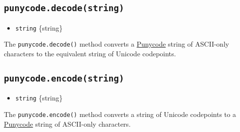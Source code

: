 \subsection{\texorpdfstring{\texttt{punycode.decode(string)}}{punycode.decode(string)}}\label{punycode.decodestring}

\begin{itemize}
\tightlist
\item
  \texttt{string} \{string\}
\end{itemize}

The \texttt{punycode.decode()} method converts a
\href{https://tools.ietf.org/html/rfc3492}{Punycode} string of
ASCII-only characters to the equivalent string of Unicode codepoints.

\begin{Shaded}
\begin{Highlighting}[]
\NormalTok{(}\NormalTok{)}\OperatorTok{;} 
\NormalTok{(}\NormalTok{)}\OperatorTok{;} 
\end{Highlighting}
\end{Shaded}

\subsection{\texorpdfstring{\texttt{punycode.encode(string)}}{punycode.encode(string)}}\label{punycode.encodestring}

\begin{itemize}
\tightlist
\item
  \texttt{string} \{string\}
\end{itemize}

The \texttt{punycode.encode()} method converts a string of Unicode
codepoints to a \href{https://tools.ietf.org/html/rfc3492}{Punycode}
string of ASCII-only characters.

\begin{Shaded}
\begin{Highlighting}[]
\NormalTok{(}\NormalTok{)}\OperatorTok{;} 
\NormalTok{(}\NormalTok{)}\OperatorTok{;} 
\end{Highlighting}
\end{Shaded}

